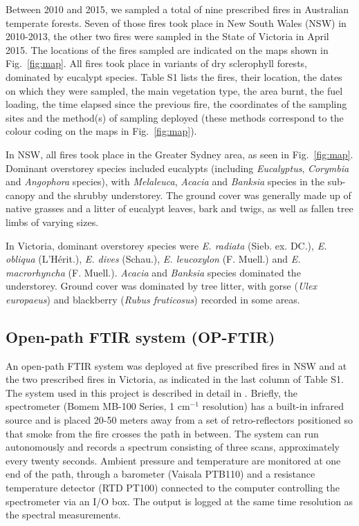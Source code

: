 \documentclass[acp, manuscript]{copernicus}
\begin{document}
Between 2010 and 2015, we sampled a total of nine prescribed fires in Australian temperate forests. Seven of those fires took place in New South Wales (NSW) in 2010-2013, the other two fires were sampled in the State of Victoria in April 2015. The locations of the fires sampled are indicated on the maps shown in Fig.~\ref{fig:map}. All fires took place in variants of dry sclerophyll forests, dominated by eucalypt species. Table S1 lists the fires, their location, the dates on which they were sampled, the main vegetation type, the area burnt, the fuel loading, the time elapsed since the previous fire, the coordinates of the sampling sites and the method(s) of sampling deployed (these methods correspond to the colour coding on the maps in Fig.~\ref{fig:map}). 

In NSW, all fires took place in the Greater Sydney area, as seen in Fig.~\ref{fig:map}. Dominant overstorey species included eucalypts (including \textit{Eucalyptus}, \textit{Corymbia} and \textit{Angophora} species), with \textit{Melaleuca}, \textit{Acacia} and \textit{Banksia} species in the sub-canopy and the shrubby understorey. The ground cover was generally made up of native grasses and a litter of eucalypt leaves, bark and twigs, as well as fallen tree limbs of varying sizes.
 
In Victoria, dominant overstorey species were \textit{E. radiata} (Sieb. ex. DC.), \textit{E. obliqua} (L'H\'erit.), \textit{E. dives} (Schau.), \textit{E. leucoxylon} (F. Muell.) 
and \textit{E. macrorhyncha} (F. Muell.). \textit{Acacia} and \textit{Banksia} species dominated the understorey. Ground cover was dominated by tree litter, with gorse (\textit{Ulex europaeus}) and blackberry (\textit{Rubus fruticosus}) recorded in some areas.


\subsection{Open-path FTIR system (OP-FTIR)}


An open-path FTIR system was deployed at five prescribed fires in NSW and at the two prescribed fires in Victoria, as indicated in the last column of Table S1. The system used in this project is described in detail in \citet{Paton-Walsh2014}. Briefly, the spectrometer (Bomem MB-100 Series, 1 cm$^{-1}$ resolution) has a built-in infrared source and is placed 20-50 meters away from a set of retro-reflectors positioned so that smoke from the fire crosses the path in between. The system can run autonomously and records a spectrum consisting of three scans, approximately every twenty seconds. Ambient pressure and temperature are monitored at one end of the path, through a barometer (Vaisala PTB110) and a resistance temperature detector (RTD PT100) connected to the computer controlling the spectrometer via an I/O box. The output is logged at the same time resolution as the spectral measurements. 
\end{document}
